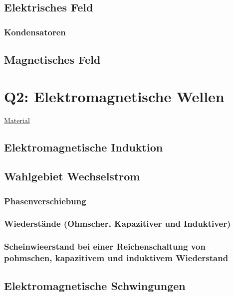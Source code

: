 \documentclass{article}
\begin{document}
        \subsection{Elektrisches Feld}
        
        	\subsubsection{Kondensatoren}	
        
        \subsection{Magnetisches Feld}

    \section{Q2: Elektromagnetische Wellen}

    \href{https://gcm.schule/material/2023/physik/lk12/#q1}{Material}
    	\subsection{Elektromagnetische Induktion}
    	
    	\subsection{Wahlgebiet Wechselstrom}
    	
    		\subsubsection{Phasenverschiebung}
    		
    		\subsubsection{Wiederstände (Ohmscher, Kapazitiver und Induktiver)}
    		
    		\subsubsection{Scheinwieerstand bei einer Reichenschaltung von pohmschen, kapazitivem und induktivem Wiederstand}
    	
    	\subsection{Elektromagnetische Schwingungen}
\end{document}
